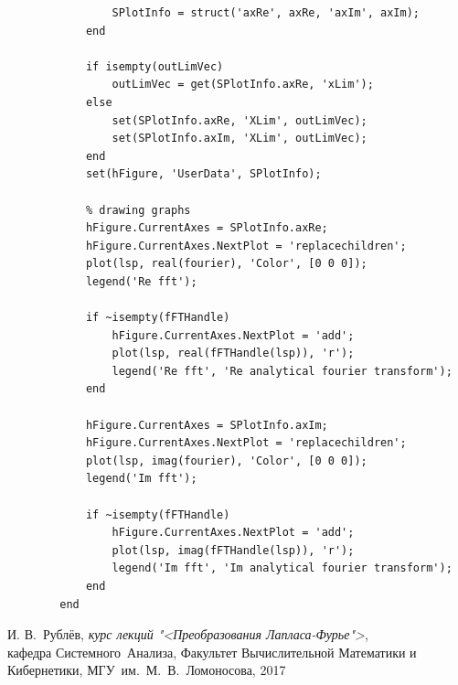 \documentclass[11pt, oneside, draft]{article}
\numberwithin{equation}{section}
\begin{document}
\begin{verbatim}
                SPlotInfo = struct('axRe', axRe, 'axIm', axIm);
            end
        
            if isempty(outLimVec)
                outLimVec = get(SPlotInfo.axRe, 'xLim');
            else
                set(SPlotInfo.axRe, 'XLim', outLimVec);
                set(SPlotInfo.axIm, 'XLim', outLimVec);
            end
            set(hFigure, 'UserData', SPlotInfo);
        
            % drawing graphs
            hFigure.CurrentAxes = SPlotInfo.axRe;
            hFigure.CurrentAxes.NextPlot = 'replacechildren';
            plot(lsp, real(fourier), 'Color', [0 0 0]); 
            legend('Re fft');
         
            if ~isempty(fFTHandle) 
                hFigure.CurrentAxes.NextPlot = 'add';
                plot(lsp, real(fFTHandle(lsp)), 'r');
                legend('Re fft', 'Re analytical fourier transform');
            end

            hFigure.CurrentAxes = SPlotInfo.axIm;
            hFigure.CurrentAxes.NextPlot = 'replacechildren';
            plot(lsp, imag(fourier), 'Color', [0 0 0]);
            legend('Im fft');
        
            if ~isempty(fFTHandle) 
                hFigure.CurrentAxes.NextPlot = 'add';
                plot(lsp, imag(fFTHandle(lsp)), 'r');
                legend('Im fft', 'Im analytical fourier transform');
            end
        end
    \end{verbatim}
    \begin{thebibliography}{0}
         И. В.~Рублёв, \emph{курс лекций "<Преобразования Лапласа-Фурье">},
        \\кафедра Системного~Анализа, Факультет Вычислительной Математики и Кибернетики, МГУ~им.~М.~В.~Ломоносова, 
        2017
    \end{thebibliography}
\end{document}

